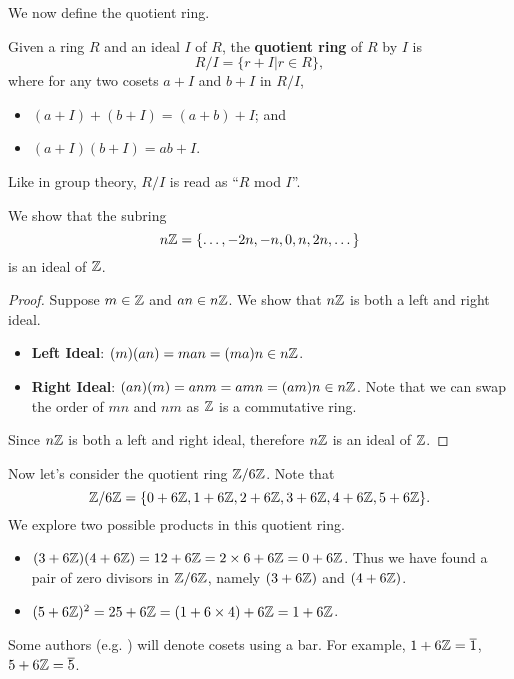 We now define the quotient ring.
\begin{definition}
    Given a ring $R$ and an ideal $I$ of $R$, the \textbf{quotient ring} of $R$ by $I$ is
    \[
        R/I = \{r + I \vert r \in R\},
    \]
    where for any two cosets $a+I$ and $b+I$ in $R/I$,
    \begin{itemize}
        \item $(a+I) + (b+I) = (a+b)+I$; and
        \item $(a+I)(b+I) = ab+I$.
    \end{itemize}
\end{definition}
\begin{remark}
    Like in group theory, $R/I$ is read as ``$R$ mod $I$''.
\end{remark}
\begin{example}
    We show that the subring
    \[
        n\mathbb{Z} = \{\dots, -2n, -n, 0, n, 2n, \dots\}
    \]
    is an ideal of $\mathbb{Z}$.
    \begin{proof}
        Suppose $m \in \mathbb{Z}$ and $an \in n\mathbb{Z}$. We show that $n\mathbb{Z}$ is both a left and right ideal.
        \begin{itemize}
            \item \textbf{Left Ideal}: $(m)(an) = man = (ma)n \in n\mathbb{Z}$.
            \item \textbf{Right Ideal}: $(an)(m) = anm = amn = (am)n \in n\mathbb{Z}$. Note that we can swap the order of $mn$ and $nm$ as $\mathbb{Z}$ is a commutative ring.
        \end{itemize}
        Since $n\mathbb{Z}$ is both a left and right ideal, therefore $n\mathbb{Z}$ is an ideal of $\mathbb{Z}$.
    \end{proof}

    Now let's consider the quotient ring $\mathbb{Z}/6\mathbb{Z}$. Note that
    \[
        \mathbb{Z}/6\mathbb{Z} = \{0 + 6\mathbb{Z}, 1+6\mathbb{Z}, 2+6\mathbb{Z}, 3+6\mathbb{Z}, 4+6\mathbb{Z}, 5+6\mathbb{Z}\}.
    \]
    We explore two possible products in this quotient ring.
    \begin{itemize}
        \item $(3+6\mathbb{Z})(4+6\mathbb{Z}) = 12+6\mathbb{Z} = 2\times 6 + 6\mathbb{Z} = 0 + 6\mathbb{Z}$. Thus we have found a pair of zero divisors in $\mathbb{Z}/6\mathbb{Z}$, namely $(3+6\mathbb{Z})$ and $(4+6\mathbb{Z})$.
        \item $(5+6\mathbb{Z})^2 = 25+6\mathbb{Z} = (1 + 6\times4) + 6\mathbb{Z} = 1 + 6\mathbb{Z}$.
    \end{itemize}
\end{example}
\begin{remark}
    Some authors (e.g. \cite[p.~243]{dummit_foote_2004}) will denote cosets using a bar. For example, $1+6\mathbb{Z} = \overline{1}$, $5 + 6\mathbb{Z} = \overline{5}$.
\end{remark}
